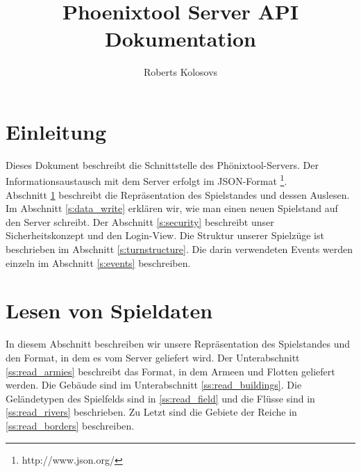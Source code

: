 \documentclass[11pt,a4paper,twocolumn]{article}
\title{Phoenixtool Server API Dokumentation}
\author{Roberts Kolosovs}
\begin{document}
\maketitle

\section*{Einleitung}
Dieses Dokument beschreibt die Schnittstelle des Phönixtool-Servers. Der Informationsaustausch mit dem Server erfolgt im JSON-Format \footnote{http://www.json.org/}.\\
Abschnitt \ref{s:data_read} beschreibt die Repräsentation des Spielstandes und dessen Auslesen. Im Abschnitt \ref{s:data_write} erklären wir, wie man einen neuen Spielstand auf den Server schreibt. Der Abschnitt \ref{s:security} beschreibt unser Sicherheitskonzept und den Login-View. Die Struktur unserer Spielzüge ist beschrieben im Abschnitt \ref{s:turnstructure}. Die darin verwendeten Events werden einzeln im Abschnitt \ref{s:events} beschreiben.

\section{Lesen von Spieldaten}\label{s:data_read}
In diesem Abschnitt beschreiben wir unsere Repräsentation des Spielstandes und den Format, in dem es vom Server geliefert wird. Der Unterabschnitt \ref{ss:read_armies} beschreibt das Format, in dem Armeen und Flotten geliefert werden. Die Gebäude sind im Unterabschnitt \ref{ss:read_buildings}. Die Geländetypen des Spielfelds sind in \ref{ss:read_field} und die Flüsse sind in \ref{ss:read_rivers} beschrieben. Zu Letzt sind die Gebiete der Reiche in \ref{ss:read_borders} beschreiben.
\end{document}
